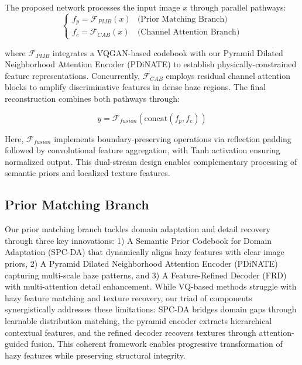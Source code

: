 \documentclass[journal]{IEEEtran}
\begin{document}
The proposed network processes the input image $x$ through parallel pathways:
\begin{equation}
	\begin{cases}
		f_p = \mathcal{F}_{PMB}(x) & \text{(Prior Matching Branch)}    \\
		f_c = \mathcal{F}_{CAB}(x) & \text{(Channel Attention Branch)}
	\end{cases}
\end{equation}

\noindent where $\mathcal{F}_{PMB}$ integrates a VQGAN-based codebook with our Pyramid Dilated Neighborhood Attention Encoder (PDiNATE) to establish physically-constrained feature representations. Concurrently, $\mathcal{F}_{CAB}$ employs residual channel attention blocks to amplify discriminative features in dense haze regions. The final reconstruction combines both pathways through:

\begin{equation}
	y = \mathcal{F}_{fusion}(\text{concat}(f_p, f_c))
\end{equation}

\noindent Here, $\mathcal{F}_{fusion}$ implements boundary-preserving operations via reflection padding followed by convolutional feature aggregation, with Tanh activation ensuring normalized output. This dual-stream design enables complementary processing of semantic priors and localized texture features.

\subsection{Prior Matching Branch}
Our prior matching branch tackles domain adaptation and detail recovery through three key innovations: 1) A Semantic Prior Codebook for Domain Adaptation (SPC-DA) that dynamically aligns hazy features with clear image priors, 2) A Pyramid Dilated Neighborhood Attention Encoder (PDiNATE) capturing multi-scale haze patterns, and 3) A Feature-Refined Decoder (FRD) with multi-attention detail enhancement. While VQ-based methods struggle with hazy feature matching and texture recovery, our triad of components synergistically addresses these limitations: SPC-DA bridges domain gaps through learnable distribution matching, the pyramid encoder extracts hierarchical contextual features, and the refined decoder recovers textures through attention-guided fusion. This coherent framework enables progressive transformation of hazy features while preserving structural integrity.
\end{document}
